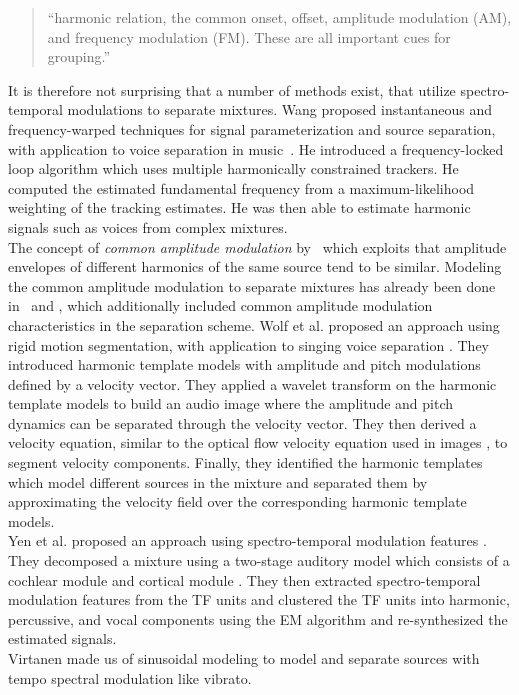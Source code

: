 \begin{quote}
``harmonic relation, the common onset, offset, amplitude modulation (AM), and frequency modulation (FM). These are all important cues for grouping.''
\end{quote}


It is therefore not surprising that a number of methods exist, that utilize spectro-temporal modulations to separate mixtures.
Wang proposed instantaneous and frequency-warped techniques for signal parameterization and source separation, with application to voice separation in music~\cite{wang94,wang95}.
He introduced a frequency-locked loop algorithm which uses multiple harmonically constrained trackers.
He computed the estimated fundamental frequency from a maximum-likelihood weighting of the tracking estimates. He was then able to estimate harmonic signals such as voices from complex mixtures.\\
The concept of \emph{common amplitude modulation} by~\cite{bregman, wang06} which exploits that amplitude envelopes of different harmonics of the same source tend to be similar.
Modeling the common amplitude modulation to separate mixtures has already been done in~\cite{li07, li09} and \cite{cano14}, which additionally included common amplitude modulation characteristics in the separation scheme.
Wolf et al. proposed an approach using rigid motion segmentation, with application to singing voice separation \cite{wolf14, wolf16}. They introduced harmonic template models with amplitude and pitch modulations defined by a velocity vector. They applied a wavelet transform \cite{anden14} on the harmonic template models to build an audio image where the amplitude and pitch dynamics can be separated through the velocity vector. They then derived a velocity equation, similar to the optical flow velocity equation used in images \cite{bernard01}, to segment velocity components. Finally, they identified the harmonic templates which model different sources in the mixture and separated them by approximating the velocity field over the corresponding harmonic template models.\\
Yen et al. proposed an approach using spectro-temporal modulation features \cite{yen14,yen15}. They decomposed a mixture using a two-stage auditory model which consists of a cochlear module \cite{chi05} and cortical module \cite{chi99}. They then extracted spectro-temporal modulation features from the TF units and clustered the TF units into harmonic, percussive, and vocal components using the EM algorithm and re-synthesized the estimated signals.\\
Virtanen made us of sinusoidal modeling \cite{virtanen00} to model and separate sources with tempo spectral modulation like vibrato.

